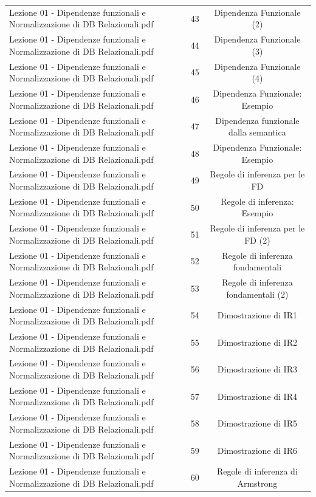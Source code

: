 \documentclass[11pt]{article}
\begin{document}
\begin{longtable}{@{}p{}cc@{}}
Lezione 01 - Dipendenze funzionali e Normalizzazione di DB Relazionali.pdf & 43 & Dipendenza Funzionale (2) \\
Lezione 01 - Dipendenze funzionali e Normalizzazione di DB Relazionali.pdf & 44 & Dipendenza Funzionale (3) \\
Lezione 01 - Dipendenze funzionali e Normalizzazione di DB Relazionali.pdf & 45 & Dipendenza Funzionale (4) \\
Lezione 01 - Dipendenze funzionali e Normalizzazione di DB Relazionali.pdf & 46 & Dipendenza Funzionale: Esempio \\
Lezione 01 - Dipendenze funzionali e Normalizzazione di DB Relazionali.pdf & 47 & Dipendenza funzionale dalla semantica \\
Lezione 01 - Dipendenze funzionali e Normalizzazione di DB Relazionali.pdf & 48 & Dipendenza Funzionale: Esempio \\
Lezione 01 - Dipendenze funzionali e Normalizzazione di DB Relazionali.pdf & 49 & Regole di inferenza per le FD \\
Lezione 01 - Dipendenze funzionali e Normalizzazione di DB Relazionali.pdf & 50 & Regole di inferenza: Esempio \\
Lezione 01 - Dipendenze funzionali e Normalizzazione di DB Relazionali.pdf & 51 & Regole di inferenza per le FD (2) \\
Lezione 01 - Dipendenze funzionali e Normalizzazione di DB Relazionali.pdf & 52 & Regole di inferenza fondamentali \\
Lezione 01 - Dipendenze funzionali e Normalizzazione di DB Relazionali.pdf & 53 & Regole di inferenza fondamentali (2) \\
Lezione 01 - Dipendenze funzionali e Normalizzazione di DB Relazionali.pdf & 54 & Dimostrazione di IR1 \\
Lezione 01 - Dipendenze funzionali e Normalizzazione di DB Relazionali.pdf & 55 & Dimostrazione di IR2 \\
Lezione 01 - Dipendenze funzionali e Normalizzazione di DB Relazionali.pdf & 56 & Dimostrazione di IR3 \\
Lezione 01 - Dipendenze funzionali e Normalizzazione di DB Relazionali.pdf & 57 & Dimostrazione di IR4 \\
Lezione 01 - Dipendenze funzionali e Normalizzazione di DB Relazionali.pdf & 58 & Dimostrazione di IR5 \\
Lezione 01 - Dipendenze funzionali e Normalizzazione di DB Relazionali.pdf & 59 & Dimostrazione di IR6 \\
Lezione 01 - Dipendenze funzionali e Normalizzazione di DB Relazionali.pdf & 60 & Regole di inferenza di Armstrong \\

\end{longtable}
\end{document}
